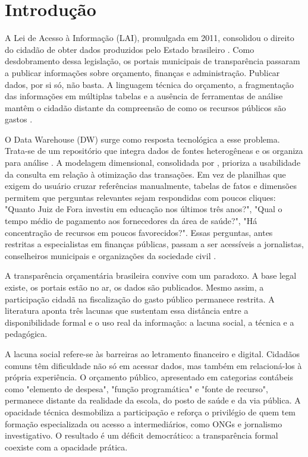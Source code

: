 \chapter{Introdução}
\label{cap:intro}

A Lei de Acesso à Informação (LAI), promulgada em 2011, consolidou o direito do cidadão de obter dados produzidos pelo Estado brasileiro \cite{Lei:12.527:2011}. Como desdobramento dessa legislação, os portais municipais de transparência passaram a publicar informações sobre orçamento, finanças e administração. Publicar dados, por si só, não basta. A linguagem técnica do orçamento, a fragmentação das informações em múltiplas tabelas e a ausência de ferramentas de análise mantêm o cidadão distante da compreensão de como os recursos públicos são gastos \cite{matiaspereira2010,melo2019proposta}.

O Data Warehouse (DW) surge como resposta tecnológica a esse problema. Trata-se de um repositório que integra dados de fontes heterogêneas e os organiza para análise \cite{kimball2013data}. A modelagem dimensional, consolidada por , prioriza a usabilidade da consulta em relação à otimização das transações. Em vez de planilhas que exigem do usuário cruzar referências manualmente, tabelas de fatos e dimensões permitem que perguntas relevantes sejam respondidas com poucos cliques: "Quanto Juiz de Fora investiu em educação nos últimos três anos?", "Qual o tempo médio de pagamento aos fornecedores da área de saúde?", "Há concentração de recursos em poucos favorecidos?". Essas perguntas, antes restritas a especialistas em finanças públicas, passam a ser acessíveis a jornalistas, conselheiros municipais e organizações da sociedade civil \cite{marco2022transparencia}.

A transparência orçamentária brasileira convive com um paradoxo. A base legal existe, os portais estão no ar, os dados são publicados. Mesmo assim, a participação cidadã na fiscalização do gasto público permanece restrita. A literatura aponta três lacunas que sustentam essa distância entre a disponibilidade formal e o uso real da informação: a lacuna social, a técnica e a pedagógica.

A lacuna social refere-se às barreiras ao letramento financeiro e digital. Cidadãos comuns têm dificuldade não só em acessar dados, mas também em relacioná-los à própria experiência. O orçamento público, apresentado em categorias contábeis como "elemento de despesa", "função programática" e "fonte de recurso", permanece distante da realidade da escola, do posto de saúde e da via pública. A opacidade técnica desmobiliza a participação e reforça o privilégio de quem tem formação especializada ou acesso a intermediários, como ONGs e jornalismo investigativo. O resultado é um déficit democrático: a transparência formal coexiste com a opacidade prática.

